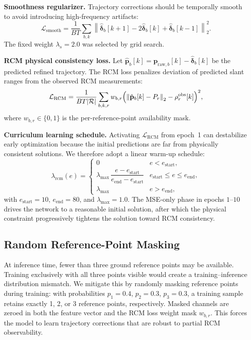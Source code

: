 \documentclass[conference]{IEEEtran}
\newcommand{\vp}{\mathbf{p}}
\newcommand{\vdelta}{\bm{\delta}}
\newcommand{\norm}[1]{\left\lVert#1\right\rVert}
\begin{document}
\textbf{Smoothness regularizer.}
Trajectory corrections should be temporally smooth to avoid introducing
high-frequency artifacts:
\begin{equation}
  \mathcal{L}_\text{smooth} = \frac{1}{BT}
    \sum_{b,k}\norm{\hat{\vdelta}_b[k+1] - 2\hat{\vdelta}_b[k] + \hat{\vdelta}_b[k-1]}_2^2.
  \label{eq:smooth}
\end{equation}
The fixed weight $\lambda_s{=}2.0$ was selected by grid search.

\textbf{RCM physical consistency loss.}
Let $\hat{\vp}_b[k] = \vp_{\text{raw},b}[k] - \hat{\vdelta}_b[k]$ be the
predicted refined trajectory.
The RCM loss penalizes deviation of predicted slant ranges from
the observed RCM measurements:
\begin{equation}
  \mathcal{L}_\text{RCM} = \frac{1}{BT|\mathcal{R}|}\sum_{b,k,r}
    w_{b,r}\Bigl(\norm{\hat{\vp}_b[k] - P_r}_2 - \rho_r^{\text{obs}}[k]\Bigr)^2,
  \label{eq:rcm_loss}
\end{equation}
where $w_{b,r} \in \{0,1\}$ is the per-reference-point availability mask.

\textbf{Curriculum learning schedule.}
Activating $\mathcal{L}_\text{RCM}$ from epoch~1 can destabilize early
optimization because the initial predictions are far from
physically consistent solutions.
We therefore adopt a linear warm-up schedule:
\begin{equation}
  \lambda_\text{rcm}(e) =
  \begin{cases}
    0 & e < e_\text{start}, \\
    \lambda_\text{max}\,\dfrac{e - e_\text{start}}{e_\text{end} - e_\text{start}}
      & e_\text{start} \le e \le e_\text{end}, \\
    \lambda_\text{max} & e > e_\text{end},
  \end{cases}
  \label{eq:schedule}
\end{equation}
with $e_\text{start}{=}10$, $e_\text{end}{=}80$, and $\lambda_\text{max}{=}1.0$.
The MSE-only phase in epochs $1$–$10$ drives the network to a reasonable
initial solution, after which the physical constraint progressively tightens
the solution toward RCM consistency.

\subsection{Random Reference-Point Masking}
\label{sec:masking}

At inference time, fewer than three ground reference points may be available.
Training exclusively with all three points visible would create a
training–inference distribution mismatch.
We mitigate this by randomly masking reference points during training:
with probabilities $p_1{=}0.4$, $p_2{=}0.3$, $p_3{=}0.3$,
a training sample retains exactly 1, 2, or 3 reference points, respectively.
Masked channels are zeroed in both the feature vector and the RCM loss weight
mask $w_{b,r}$.
This forces the model to learn trajectory corrections that are robust to
partial RCM observability.
\end{document}
